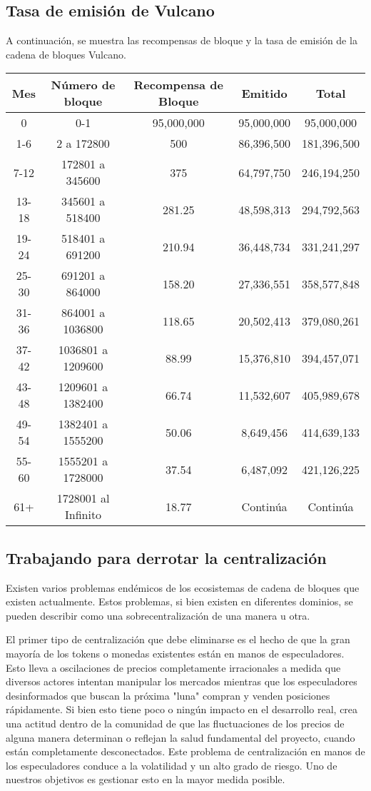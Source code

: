 \documentclass[A4paper, 12pt]{article}
\begin{document}
\subsection{Tasa de emisión de Vulcano}
A continuación, se muestra las recompensas de bloque y la tasa de emisión de la cadena de bloques Vulcano.
\begin{table}[h]
\centering
\begin{tabular}{@{}ccccc@{}}
\toprule
Mes & Número de bloque & Recompensa de Bloque & Emitido & Total \\ \midrule
0 & 0-1 & 95,000,000 & 95,000,000 & 95,000,000 \\
1-6 & 2 a 172800 & 500 & 86,396,500 & 181,396,500 \\
7-12 & 172801 a 345600 & 375 & 64,797,750 & 246,194,250 \\
13-18 & 345601 a 518400 & 281.25 & 48,598,313 & 294,792,563 \\
19-24 & 518401 a 691200 & 210.94 & 36,448,734 & 331,241,297 \\
25-30 & 691201 a 864000 & 158.20 & 27,336,551 & 358,577,848 \\
31-36 & 864001 a 1036800 & 118.65 & 20,502,413 & 379,080,261 \\
37-42 & 1036801 a 1209600 & 88.99 & 15,376,810 & 394,457,071 \\
43-48 & 1209601 a 1382400 & 66.74 & 11,532,607 & 405,989,678 \\
49-54 & 1382401 a 1555200 & 50.06 & 8,649,456 & 414,639,133 \\
55-60 & 1555201 a 1728000 & 37.54 & 6,487,092 & 421,126,225 \\
61+ & 1728001 al Infinito & 18.77 & Continúa & Continúa \\ \bottomrule
\end{tabular}
\end{table}

\subsection{Trabajando para derrotar la centralización}

Existen varios problemas endémicos de los ecosistemas de cadena de bloques que existen actualmente. Estos problemas, si bien existen en diferentes dominios, se pueden describir como una sobrecentralización de una manera u otra.

El primer tipo de centralización que debe eliminarse es el hecho de que la gran mayoría de los tokens o monedas existentes están en manos de especuladores. Esto lleva a oscilaciones de precios completamente irracionales a medida que diversos actores intentan manipular los mercados mientras que los especuladores desinformados que buscan la próxima "luna" compran y venden posiciones rápidamente.  Si bien esto tiene poco o ningún impacto en el desarrollo real, crea una actitud dentro de la comunidad de que las fluctuaciones de los precios de alguna manera determinan o reflejan la salud fundamental del proyecto, cuando están completamente desconectados. Este problema de centralización en manos de los especuladores conduce a la volatilidad y un alto grado de riesgo. Uno de nuestros objetivos es gestionar esto en la mayor medida posible.
\end{document}
